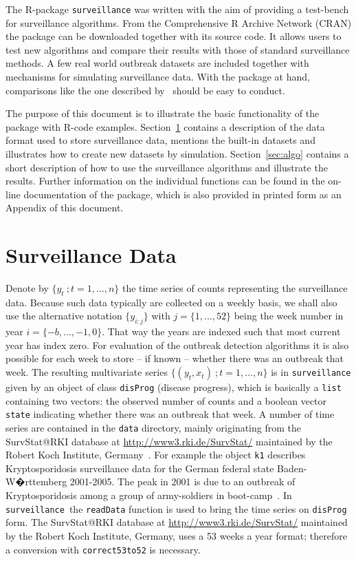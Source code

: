 \documentclass[a4paper,11pt]{article}
\newcommand{\surveillance}{\texttt{surveillance}}
\begin{document}
The R-package \texttt{surveillance} was written with the aim of
providing a test-bench for surveillance algorithms. From the
Comprehensive R Archive Network (CRAN) the package can be downloaded
together with its source code. It allows users to test new algorithms
and compare their results with those of standard surveillance
methods. A few real world outbreak datasets are included together with
mechanisms for simulating surveillance data.  With the package at
hand, comparisons like the one described by~\citet{hutwagner2005}
should be easy to conduct.

The purpose of this document is to illustrate the basic functionality
of the package with R-code examples.  Section~\ref{sec:data} contains
a description of the data format used to store surveillance data,
mentions the built-in datasets and illustrates how to create new
datasets by simulation.  Section~\ref{sec:algo} contains a short
description of how to use the surveillance algorithms and illustrate
the results.  Further information on the individual functions can be
found in the on-line documentation of the package, which is also
provided in printed form as an Appendix of this document.

\section{Surveillance Data}\label{sec:data}
Denote by $\{y_t\>;t=1,\ldots,n\}$ the time series of counts
representing the surveillance data. Because such data typically are
collected on a weekly basis, we shall also use the alternative
notation $\{y_{i:j}\}$ with $j=\{1,\ldots,52\}$ being the week number
in year $i=\{-b,\ldots,-1,0\}$. That way the years are indexed such
that most current year has index zero. For evaluation of the outbreak
detection algorithms it is also possible for each week to store -- if
known -- whether there was an outbreak that week. The resulting
multivariate series $\{(y_t,x_t)\>; t=1,\ldots,n\}$ is in
\texttt{surveillance} given by an object of class \texttt{disProg}
(disease progress), which is basically a \texttt{list} containing two
vectors: the observed number of counts and a boolean vector
\texttt{state} indicating whether there was an outbreak that week. A
number of time series are contained in the \texttt{data} directory,
mainly originating from the SurvStat@RKI database at
\href{http://www3.rki.de/SurvStat/}{http://www3.rki.de/SurvStat/}
maintained by the Robert Koch Institute, Germany~\citep{survstat}.
For example the object \texttt{k1} describes Kryptosporidosis
surveillance data for the German federal state Baden-W�rttemberg
2001-2005. The peak in 2001 is due to an outbreak of Kryptosporidosis
among a group of army-soldiers in boot-camp~\citep{bulletin3901}. In
\surveillance\ the \texttt{readData} function is used to bring the
time series on \texttt{disProg} form. The SurvStat@RKI database at
\href{http://www3.rki.de/SurvStat/}{http://www3.rki.de/SurvStat/}
maintained by the Robert Koch Institute, Germany, uses a 53 weeks a
year format; therefore a conversion with \texttt{correct53to52} is
necessary.
\end{document}
